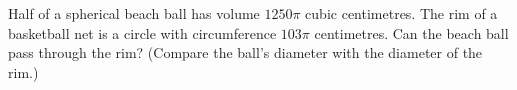 Half of a spherical beach ball has volume $1250\pi$ cubic centimetres. The rim of a basketball net is a circle with circumference $103\pi$ centimetres. Can the beach ball pass through the rim? (Compare the ball's diameter with the diameter of the rim.)
